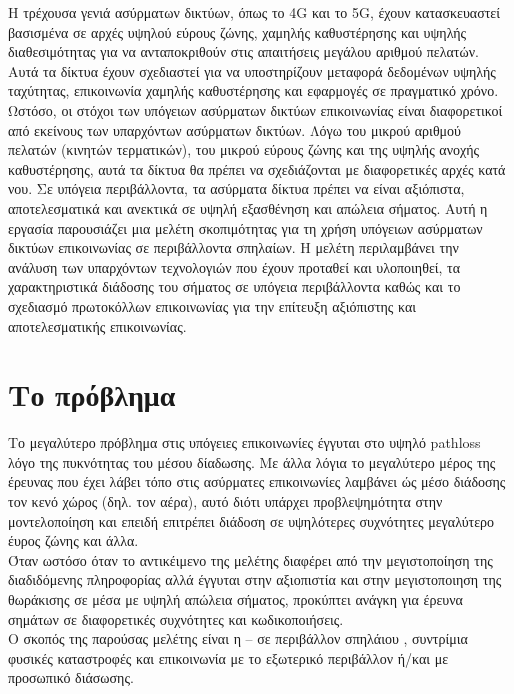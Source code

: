 \documentclass[12pt]{article}
\begin{document}
\begin{multicols*}{2}
        Η τρέχουσα γενιά ασύρματων δικτύων, όπως το 4G και το 5G, έχουν κατασκευαστεί βασισμένα σε αρχές υψηλού εύρους ζώνης, χαμηλής καθυστέρησης και υψηλής
        διαθεσιμότητας για να ανταποκριθούν στις απαιτήσεις μεγάλου αριθμού πελατών. Αυτά τα δίκτυα έχουν σχεδιαστεί για να υποστηρίζουν μεταφορά δεδομένων
        υψηλής ταχύτητας, επικοινωνία χαμηλής καθυστέρησης και εφαρμογές σε πραγματικό χρόνο.
        Ωστόσο, οι στόχοι των υπόγειων ασύρματων δικτύων επικοινωνίας είναι διαφορετικοί από εκείνους των υπαρχόντων ασύρματων δικτύων. Λόγω του μικρού αριθμού
        πελατών (κινητών τερματικών), του μικρού εύρους ζώνης και της υψηλής ανοχής καθυστέρησης, αυτά τα δίκτυα θα πρέπει να σχεδιάζονται με διαφορετικές αρχές
        κατά νου. Σε υπόγεια περιβάλλοντα, τα ασύρματα δίκτυα πρέπει να είναι αξιόπιστα, αποτελεσματικά και ανεκτικά σε υψηλή εξασθένηση και απώλεια σήματος.
        Αυτή η εργασία παρουσιάζει μια μελέτη σκοπιμότητας για τη χρήση υπόγειων ασύρματων δικτύων επικοινωνίας σε περιβάλλοντα σπηλαίων. Η μελέτη περιλαμβάνει
        την ανάλυση των υπαρχόντων τεχνολογιών που έχουν προταθεί και υλοποιηθεί, τα χαρακτηριστικά διάδοσης του σήματος σε υπόγεια περιβάλλοντα καθώς και το
        σχεδιασμό πρωτοκόλλων επικοινωνίας για την επίτευξη αξιόπιστης και αποτελεσματικής επικοινωνίας.

    \section{\normalsize \textsf{Το πρόβλημα}}
    Το μεγαλύτερο πρόβλημα στις υπόγειες επικοινωνίες έγγυται στο υψηλό pathloss λόγο της πυκνότητας του μέσου δίαδωσης. Με άλλα λόγια το μεγαλύτερο μέρος της 
    έρευνας που έχει λάβει τόπο στις ασύρματες επικοινωνίες λαμβάνει ώς μέσο διάδοσης τον κενό χώρος (δηλ. τον αέρα), αυτό διότι υπάρχει προβλεψημότητα στην
    μοντελοποίηση και επειδή επιτρέπει διάδοση σε υψηλότερες συχνότητες μεγαλύτερο έυρος ζώνης και άλλα.\\
    Όταν ωστόσο όταν το αντικέιμενο της μελέτης διαφέρει από την μεγιστοποίηση της διαδιδόμενης πληροφορίας αλλά έγγυται στην αξιοπιστία και στην μεγιστοποιηση
    της θωράκισης σε μέσα με υψηλή απώλεια σήματος, προκύπτει ανάγκη για έρευνα σημάτων σε διαφορετικές συχνότητες και κωδικοποιήσεις.\\
    Ο σκοπός της παρούσας μελέτης είναι η -- σε περιβάλλον σπηλάιου , συντρίμια φυσικές καταστροφές και επικοινωνία με το εξωτερικό περιβάλλον ή/και με προσωπικό
    διάσωσης.


\end{multicols*}
\end{document}
